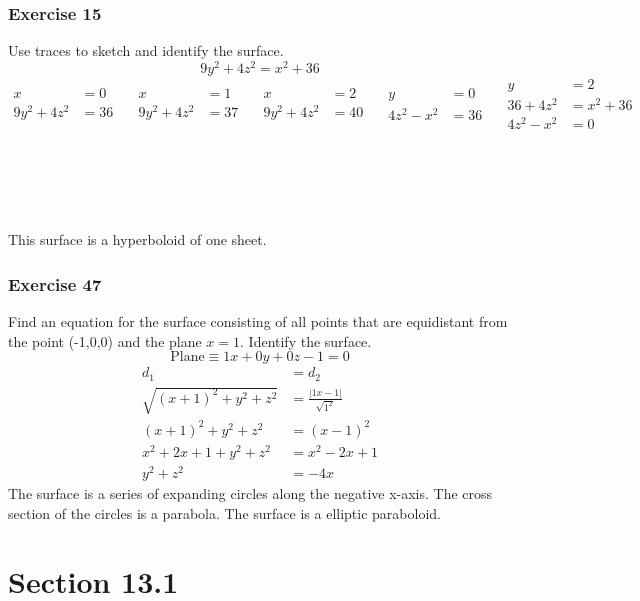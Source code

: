 \documentclass[letterpaper, 12pt]{math}
\begin{document}
\subsubsection*{Exercise 15}
Use traces to sketch and identify the surface.
\[ 9y^2+4z^2 = x^2+36 \]
\[\begin{split}
  x &= 0 \\
  9y^2+4z^2 &= 36
\end{split}\quad
\begin{split}
  x &= 1 \\
  9y^2+4z^2 &= 37
\end{split}\quad
\begin{split}
  x &= 2 \\
  9y^2+4z^2 &= 40
\end{split}\quad
\begin{split}
  y &= 0 \\
  4z^2-x^2 &= 36
\end{split}\quad
\begin{split}
  y &= 2 \\
  36+4z^2 &= x^2+36 \\
  4z^2-x^2 &= 0
\end{split} \]
\\ \\ \\ \\ \\
This surface is a hyperboloid of one sheet.

\subsubsection*{Exercise 47}
Find an equation for the surface consisting of all points that are
equidistant from the point (-1,0,0) and the plane \( x = 1 \). Identify the
surface.
\[ \text{Plane} \equiv 1x+0y+0z-1 = 0 \]
\begin{align*}
  d_1 &= d_2 \\
  \sqrt{(x+1)^2+y^2+z^2} &= \frac{|1x-1|}{\sqrt{1^2}} \\
  (x+1)^2+y^2+z^2 &= (x-1)^2 \\
  x^2+2x+1+y^2+z^2 &= x^2-2x+1 \\
  y^2+z^2 &= -4x
\end{align*}
The surface is a series of expanding circles along the negative x-axis. The
cross section of the circles is a parabola. The surface is a elliptic
paraboloid.

\section*{Section 13.1}
\end{document}
